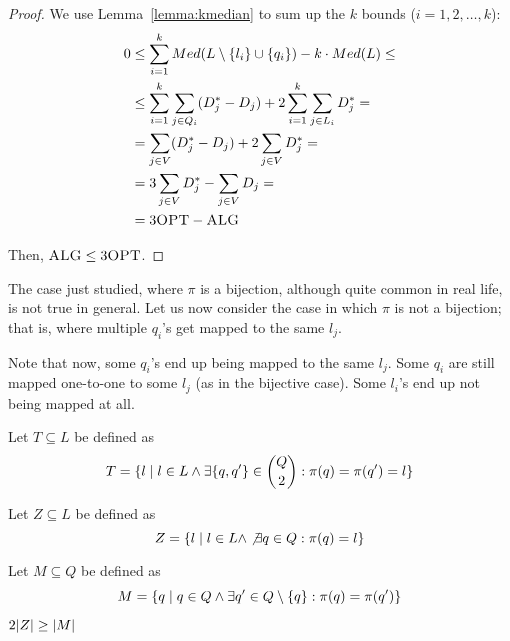     \begin{proof}
        We use Lemma~\ref{lemma:kmedian} to sum up the $k$ bounds ($i = 1, 2, \dots, k$):
        \begin{equation*}
            \begin{split}
                0 &\leq \sum_{i=1}^{k} Med(L \setminus \{l_i\} \cup \{q_i\}) - k \cdot Med(L) \leq\\
                    &\leq \sum_{i=1}^{k} \sum_{j \in Q_i} (D_j^* - D_j) + 2 \sum_{i=1}^{k} \sum_{j \in L_i} D_j^* =\\
                    &= \sum_{j \in V} (D_j^* - D_j) + 2 \sum_{j \in V} D_j^* =\\
                    &= 3 \sum_{j \in V} D_j^* - \sum_{j \in V} D_j =\\
                    &= 3 \textsc{OPT} - \textsc{ALG}
            \end{split}
        \end{equation*}

        Then, $\textsc{ALG} \leq 3 \textsc{OPT}$.
    \end{proof}

    The case just studied, where $\pi$ is a bijection, although quite common in real life, is not true in general.
    Let us now consider the case in which $\pi$ is not a bijection; that is, where multiple $q_i$'s get mapped to the same $l_j$.

    Note that now, some $q_i$'s end up being mapped to the same $l_j$. Some $q_i$ are still mapped one-to-one to some $l_j$ (as in the bijective case). Some $l_i$'s end up not being mapped at all.

    Let $T \subseteq L$ be defined as
    \[ T = \{ l \; \vert \; l \in L \wedge \exists \{q,q'\} \in \binom{Q}{2} : \pi(q) = \pi(q') = l \} \]

    Let $Z \subseteq L$ be defined as
    \[ Z = \{ l \; \vert \; l \in L \wedge \not\exists q \in Q : \pi(q) = l \} \]

    Let $M \subseteq Q$ be defined as
    \[ M = \{ q \; \vert \; q \in Q \wedge \exists q' \in Q \setminus \{q\} : \pi(q) = \pi(q') \} \]

    \begin{lemma}
        $2 \vert Z \vert \geq \vert M \vert$
    \end{lemma}

